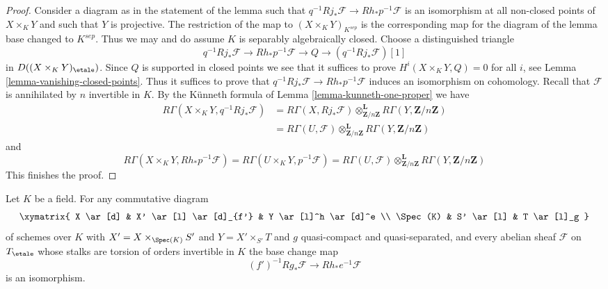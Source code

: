 \begin{proof}
\medskip\noindent
Consider a diagram as in the statement of the lemma
such that $q^{-1}Rj_*\mathcal{F} \to Rh_*p^{-1}\mathcal{F}$
is an isomorphism at all non-closed points of $X \times_K Y$
and such that $Y$ is projective.
The restriction of the map to $(X \times_K Y)_{K^{sep}}$
is the corresponding map for the diagram of the lemma
base changed to $K^{sep}$. Thus we may and do assume $K$
is separably algebraically closed. Choose a distinguished triangle
$$
q^{-1}Rj_*\mathcal{F} \to Rh_*p^{-1}\mathcal{F} \to Q \to
(q^{-1}Rj_*\mathcal{F})[1]
$$
in $D((X \times_K Y)_\etale)$. Since $Q$ is supported in
closed points we see that it suffices to prove
$H^i(X \times_K Y, Q) = 0$ for all $i$, see
Lemma \ref{lemma-vanishing-closed-points}.
Thus it suffices to prove that
$q^{-1}Rj_*\mathcal{F} \to Rh_*p^{-1}\mathcal{F}$
induces an isomorphism on cohomology. Recall that $\mathcal{F}$
is annihilated by $n$ invertible in $K$.
By the K\"unneth formula of Lemma \ref{lemma-kunneth-one-proper}
we have
\begin{align*}
R\Gamma(X \times_K Y, q^{-1}Rj_*\mathcal{F})
&=
R\Gamma(X, Rj_*\mathcal{F})
\otimes_{\mathbf{Z}/n\mathbf{Z}}^\mathbf{L}
R\Gamma(Y, \mathbf{Z}/n\mathbf{Z}) \\
& =
R\Gamma(U, \mathcal{F})
\otimes_{\mathbf{Z}/n\mathbf{Z}}^\mathbf{L}
R\Gamma(Y, \mathbf{Z}/n\mathbf{Z})
\end{align*}
and
$$
R\Gamma(X \times_K Y, Rh_*p^{-1}\mathcal{F}) =
R\Gamma(U \times_K Y, p^{-1}\mathcal{F}) =
R\Gamma(U, \mathcal{F})
\otimes_{\mathbf{Z}/n\mathbf{Z}}^\mathbf{L}
R\Gamma(Y, \mathbf{Z}/n\mathbf{Z})
$$
This finishes the proof.
\end{proof}

\begin{lemma}
\label{lemma-punctual-base-change}
Let $K$ be a field. For any commutative diagram
$$
\xymatrix{
X \ar[d] & X' \ar[l] \ar[d]_{f'} & Y \ar[l]^h \ar[d]^e \\
\Spec(K) & S' \ar[l] & T \ar[l]_g
}
$$
of schemes over $K$ with
$X' = X \times_{\Spec(K)} S'$ and $Y = X' \times_{S'} T$ and
$g$ quasi-compact and quasi-separated, and every abelian sheaf
$\mathcal{F}$ on $T_\etale$ whose stalks are torsion of orders
invertible in $K$ the base change map
$$
(f')^{-1}Rg_*\mathcal{F}
\longrightarrow
Rh_*e^{-1}\mathcal{F}
$$
is an isomorphism.
\end{lemma}

